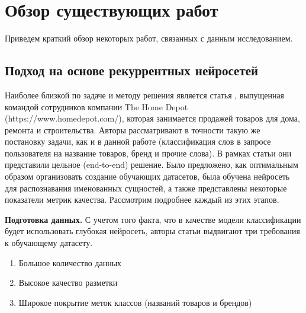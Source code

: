 \documentclass[12pt,a4paper]{article}
\begin{document}
\begin{table}[H]
\begin{center}
    \caption{Примеры размеченных запросов}
\end{center}
\end{table}

\section{Обзор существующих работ}
Приведем краткий обзор некоторых работ, связанных с данным исследованием.
\subsection{Подход на основе рекуррентных нейросетей}
Наиболее близкой по задаче и методу решения является статья \cite{ner}, выпущенная командой сотрудников компании The Home Depot (https://www.homedepot.com/), которая занимается продажей товаров для дома, ремонта и строительства. Авторы рассматривают в точности такую же постановку задачи, как и в данной работе (классификация слов в запросе пользователя на название товаров, бренд и прочие слова). В рамках статьи они представили цельное (end-to-end) решение. Было предложено, как оптимальным образом организовать создание обучающих датасетов, была обучена нейросеть для распознавания именованных сущностей, а также представлены некоторые показатели метрик качества. Рассмотрим подробнее каждый из этих этапов. 

\textbf{Подготовка данных.} С учетом того факта, что в качестве модели классификации будет использовать глубокая нейросеть, авторы статьи выдвигают три требования к обучающему датасету.

\begin{enumerate}
    \item Большое количество данных
    \item Высокое качество разметки
    \item Широкое покрытие меток классов (названий товаров и брендов)
\end{enumerate}
\end{document}
